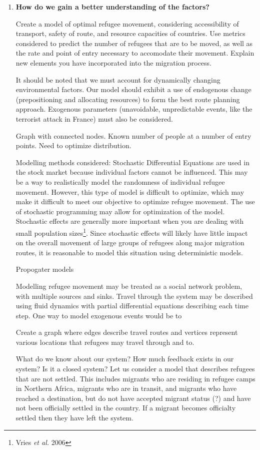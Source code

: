 \documentclass{article}
\begin{document}
\begin{enumerate}
    \item {\bf How do we gain a better understanding of the factors?}

    Create a model of optimal refugee movement, considering accessibility of transport, safety of route, and resource capacities of countries. Use metrics considered to predict the number of refugees that are to be moved, as well as the rate and point of entry necessary to accomodate their movement. Explain new elements you have incorporated into the migration process.

    It should be noted that we must account for dynamically changing environmental factors. Our model should exhibit a use of endogenous change (prepositioning and allocating resources) to form the best route planning approach. Exogenous parameters (unavoidable, unpredictable events, like the terrorist attack in France) must also be considered.

    Graph with connected nodes. Known number of people at a number of entry points. Need to optimize distribution.

    Modelling methods considered:
    Stochastic Differential Equations are used in the stock market because individual factors cannot be influenced. This may be a way to realistically model the randomness of individual refugee movement. However, this type of model is difficult to optimize, which may make it difficult to meet our objective to optimize refugee movement. The use of stochastic programming may allow for optimization of the model. Stochastic effects are generally more important when you are dealing with small population sizes\footnote{Vries {\em et al.} 2006}. Since stochastic effects will likely have little impact on the overall movement of large groups of refugees along major migration routes, it is reasonable to model this situation using deterministic models. 

    Propogater models

    Modelling refugee movement may be treated as a social network problem, with multiple sources and sinks. Travel through the system may be described using fluid dynamics with partial differential equations describing each time step. One way to model exogenous events would be to 

    Create a graph where edges describe travel routes and vertices represent various locations that refugees may travel through and to.

    What do we know about our system?
    How much feedback exists in our system? Is it a closed system? 
    Let us consider a model that describes refugees that are not settled. This includes migrants who are residing in refugee camps in Northern Africa, migrants who are in transit, and migrants who have reached a destination, but do not have accepted migrant status (?) and have not been officially settled in the country. If a migrant becomes officialty settled then they have left the system. 


\end{enumerate}
\end{document}
